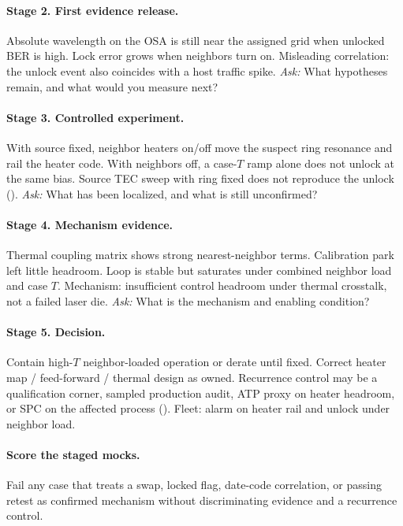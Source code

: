 \paragraph{Stage 2. First evidence release.}
Absolute wavelength on the OSA is still near the assigned grid when unlocked
BER is high. Lock error grows when neighbors turn on. Misleading correlation:
the unlock event also coincides with a host traffic spike.
\textit{Ask:} What hypotheses remain, and what would you measure next?

\paragraph{Stage 3. Controlled experiment.}
With source fixed, neighbor heaters on/off move the suspect ring resonance and
rail the heater code. With neighbors off, a case-$T$ ramp alone does not unlock
at the same bias. Source TEC sweep with ring fixed does not reproduce the
unlock ().
\textit{Ask:} What has been localized, and what is still unconfirmed?

\paragraph{Stage 4. Mechanism evidence.}
Thermal coupling matrix shows strong nearest-neighbor terms. Calibration park
left little headroom. Loop is stable but saturates under combined neighbor load
and case $T$. Mechanism: insufficient control headroom under thermal crosstalk,
not a failed laser die.
\textit{Ask:} What is the mechanism and enabling condition?

\paragraph{Stage 5. Decision.}
Contain high-$T$ neighbor-loaded operation or derate until fixed. Correct heater
map / feed-forward / thermal design as owned. Recurrence control may be a
qualification corner, sampled production audit, ATP proxy on heater headroom,
or SPC on the affected process (). Fleet: alarm on
heater rail and unlock under neighbor load.

\paragraph{Score the staged mocks.}
Fail any case that treats a swap, locked flag, date-code correlation, or
passing retest as confirmed mechanism without discriminating evidence and a
recurrence control.
